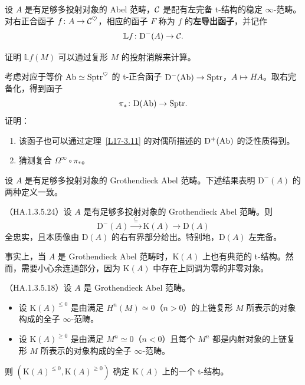 \begin{definition}\label{L17-3.12}
设 $A$ 是有足够多投射对象的 Abel 范畴，$\mathcal{C}$ 是配有左完备 t-结构的稳定 $\infty$-范畴。对右正合函子 $f\colon A\to\mathcal{C}^{\heartsuit}$，相应的函子 $F$ 称为 $f$ 的\textbf{左导出函子}，并记作
\[
\mathbb{L}f\colon\mathrm{D}^-(A)\to\mathcal{C}.
\]
\end{definition}

\begin{exercise}\label{L17-3.13}
证明 $\mathbb{L}f(M)$ 可以通过复形 $M$ 的投射消解来计算。
\end{exercise}

\begin{exercise}\label{L17-3.14}
考虑对应于等价 $\operatorname{Ab}\simeq\mathrm{Sptr}^{\heartsuit}$ 的 t-正合函子 $\mathrm{D}^-(\operatorname{Ab})\to\mathrm{Sptr}$，$A\mapsto HA$。取右完备化，得到函子
\[
\pi_*\colon\mathrm{D}(\operatorname{Ab})\to\mathrm{Sptr}.
\]
证明：
\begin{enumerate}[label=(\arabic*),leftmargin=2.4em,itemsep=0.1em]
\item 该函子也可以通过定理~\ref{L17-3.11} 的对偶所描述的 $\mathrm{D}^+(\operatorname{Ab})$ 的泛性质得到。
\item 猜测复合 $\Omega^{\infty}\circ\pi_*$。
\end{enumerate}
\end{exercise}

\nitem\label{L17-3.15} 设 $A$ 是有足够多投射对象的 Grothendieck Abel 范畴。下述结果表明 $\mathrm{D}^-(A)$ 的两种定义一致。

\begin{proposition}\label{L17-3.16}
（HA.1.3.5.24）设 $A$ 是有足够多投射对象的 Grothendieck Abel 范畴。则
\[
\mathrm{D}^-(A)\xrightarrow{\ \ \subseteq\ \ }\mathrm{K}(A)\to\mathrm{D}(A)
\]
全忠实，且本质像由 $\mathrm{D}(A)$ 的右有界部分给出。特别地，$\mathrm{D}(A)$ 左完备。
\end{proposition}

\nitem\label{L17-3.17} 事实上，当 $A$ 是 Grothendieck Abel 范畴时，$\mathrm{K}(A)$ 上也有典范的 t-结构。然而，需要小心余连通部分，因为 $\mathrm{K}(A)$ 中存在上同调为零的非零对象。

\begin{proposition}\label{L17-3.18}
（HA.1.3.5.18）设 $A$ 是 Grothendieck Abel 范畴。
\begin{itemize}[leftmargin=2.2em,itemsep=0.1em]
\item 设 $\mathrm{K}(A)^{\le0}$ 是由满足 $H^n(M)\simeq0$（$n>0$）的上链复形 $M$ 所表示的对象构成的全子 $\infty$-范畴。
\item 设 $\mathrm{K}(A)^{\ge0}$ 是由满足 $M^n\simeq0$（$n<0$）且每个 $M^n$ 都是内射对象的上链复形 $M$ 所表示的对象构成的全子 $\infty$-范畴。
\end{itemize}
则 $(\mathrm{K}(A)^{\le0},\mathrm{K}(A)^{\ge0})$ 确定 $\mathrm{K}(A)$ 上的一个 t-结构。
\end{proposition}

